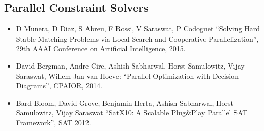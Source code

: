 \documentclass{article}
\begin{document}
\subsection*{Parallel Constraint Solvers}
\begin{itemize}
\item D Munera, D Diaz, S Abreu, F Rossi, V Saraswat, P Codognet
  ``Solving Hard Stable Matching Problems via Local Search and
  Cooperative Parallelization'', 29th AAAI Conference on Artificial
  Intelligence, 2015. 
\item David Bergman, Andre Cire, Ashish Sabharwal, Horst Samulowitz,
  Vijay Saraswat, Willem Jan van Hoeve: ``Parallel Optimization with
  Decision Diagrams'', CPAIOR, 2014.
\item Bard Bloom, David Grove, Benjamin Herta, Ashish Sabharwal, Horst
  Samulowitz, Vijay Saraswat ``SatX10: A Scalable Plug\&Play Parallel
  SAT Framework'', SAT 2012. 
\end{itemize}
\end{document}
